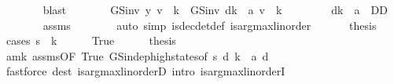 \begin{isabellebody}
\ \ \ \ \ \ \isamarkupfalse%
\ blast\isanewline
\ \ \ \ \isamarkupfalse%
\ \isamarkupfalse%
\ {\isachardoublequoteopen}GS{\isacharunderscore}{\kern0pt}inv\ y\ v\ {\isachardollar}{\kern0pt}\ k\ {\isasymle}\ GS{\isacharunderscore}{\kern0pt}inv\ {\isacharparenleft}{\kern0pt}d{\isacharparenleft}{\kern0pt}k\ {\isacharcolon}{\kern0pt}{\isacharequal}{\kern0pt}\ a{\isacharparenright}{\kern0pt}{\isacharparenright}{\kern0pt}\ v\ {\isachardollar}{\kern0pt}\ k{\isachardoublequoteclose}\isacommand{{\isachardot}{\kern0pt}}\isamarkupfalse%
\isanewline
\ \ \isamarkupfalse%
\isanewline
\ \ \ \ \isamarkupfalse%
\ {\isachardoublequoteopen}d{\isacharparenleft}{\kern0pt}k\ {\isacharcolon}{\kern0pt}{\isacharequal}{\kern0pt}\ a{\isacharparenright}{\kern0pt}\ {\isasymin}\ D\isactrlsub D{\isachardoublequoteclose}\isanewline
\ \ \ \ \ \ \isamarkupfalse%
\ assms\isanewline
\ \ \ \ \ \ \isamarkupfalse%
\ {\isacharparenleft}{\kern0pt}auto\ simp{\isacharcolon}{\kern0pt}\ is{\isacharunderscore}{\kern0pt}dec{\isacharunderscore}{\kern0pt}det{\isacharunderscore}{\kern0pt}def\ is{\isacharunderscore}{\kern0pt}arg{\isacharunderscore}{\kern0pt}max{\isacharunderscore}{\kern0pt}linorder{\isacharparenright}{\kern0pt}\isanewline
\ \ \isamarkupfalse%
\isanewline
\ \ \isamarkupfalse%
\ {\isacharquery}{\kern0pt}thesis\isanewline
\ \ \isamarkupfalse%
\ {\isacharparenleft}{\kern0pt}cases\ {\isachardoublequoteopen}s\ {\isacharless}{\kern0pt}\ k{\isachardoublequoteclose}{\isacharparenright}{\kern0pt}\isanewline
\ \ \ \ \isamarkupfalse%
\ True\isanewline
\ \ \ \ \isamarkupfalse%
\ {\isacharquery}{\kern0pt}thesis\isanewline
\ \ \ \ \ \ \isamarkupfalse%
\ am{\isacharunderscore}{\kern0pt}k\ assms{\isacharparenleft}{\kern0pt}{}{\isacharparenright}{\kern0pt}{\isacharbrackleft}{\kern0pt}OF\ True{\isacharbrackright}{\kern0pt}\ GS{\isacharunderscore}{\kern0pt}indep{\isacharunderscore}{\kern0pt}high{\isacharunderscore}{\kern0pt}states{\isacharbrackleft}{\kern0pt}of\ s\ {\isachardoublequoteopen}d\ {\isacharparenleft}{\kern0pt}k\ {\isacharcolon}{\kern0pt}{\isacharequal}{\kern0pt}\ a{\isacharparenright}{\kern0pt}{\isachardoublequoteclose}\ d{\isacharbrackright}{\kern0pt}\isanewline
\ \ \ \ \ \ \isamarkupfalse%
\ {\isacharparenleft}{\kern0pt}fastforce\ dest{\isacharcolon}{\kern0pt}\ is{\isacharunderscore}{\kern0pt}arg{\isacharunderscore}{\kern0pt}max{\isacharunderscore}{\kern0pt}linorderD\ intro{\isacharbang}{\kern0pt}{\isacharcolon}{\kern0pt}\ is{\isacharunderscore}{\kern0pt}arg{\isacharunderscore}{\kern0pt}max{\isacharunderscore}{\kern0pt}linorderI{\isacharparenright}{\kern0pt}\isanewline

\end{isabellebody}

